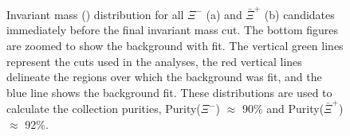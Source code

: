 \documentclass[/home/jesse/Analysis/FemtoAnalysis/AnalysisNotes/AnalysisNoteJBuxton.tex]{subfiles}
\begin{document}
\begin{figure}[h!]
  \centering
  \caption[$\Xi^{-}$($\bar{\Xi}^{+}$) Purity]{Invariant mass (\minv) distribution for all $\Xi^{-}$ (a) and $\bar{\Xi}^{+}$ (b) candidates immediately before the final invariant mass cut.  The bottom figures are zoomed to show the background with fit.  The vertical green lines represent the \minv cuts used in the analyses, the red vertical lines delineate the regions over which the background was fit, and the blue line shows the background fit.  These distributions are used to calculate the collection purities, Purity($\Xi^{-}$) $\approx$ 90\% and Purity($\bar{\Xi}^{+}$) $\approx$ 92\%.}
  \label{fig:XiPurity}
\end{figure}
\end{document}
